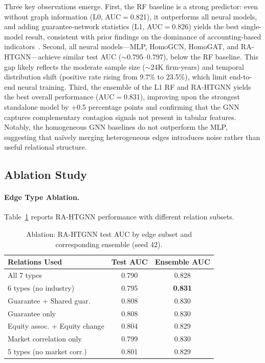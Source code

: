 \documentclass[3p,times,procedia]{elsarticle}
\begin{document}
Three key observations emerge.
First, the RF baseline is a strong predictor: even without graph information (L0, AUC$=$0.821), it outperforms all neural models, and adding guarantee-network statistics (L1, AUC$=$0.826) yields the best single-model result, consistent with prior findings on the dominance of accounting-based indicators~\cite{barboza2017machine, duan2012multiperiod}.
Second, all neural models---MLP, HomoGCN, HomoGAT, and RA-HTGNN---achieve similar test AUC ($\sim$0.795--0.797), below the RF baseline. This gap likely reflects the moderate sample size ($\sim$24K firm-years) and temporal distribution shift (positive rate rising from 9.7\% to 23.5\%), which limit end-to-end neural training.
Third, the ensemble of the L1 RF and RA-HTGNN yields the best overall performance (AUC$=$0.831), improving upon the strongest standalone model by $+$0.5 percentage points and confirming that the GNN captures complementary contagion signals not present in tabular features.
Notably, the homogeneous GNN baselines do not outperform the MLP, suggesting that na\"{i}vely merging heterogeneous edges introduces noise rather than useful relational structure.


\subsection{Ablation Study}
\label{subsec:ablation}

\paragraph{Edge Type Ablation.}
Table~\ref{tab:ablation} reports RA-HTGNN performance with different relation subsets.

\begin{table}[htbp]
\centering
\caption{Ablation: RA-HTGNN test AUC by edge subset and corresponding ensemble (seed 42).}\label{tab:ablation}
\begin{tabular}{@{}lcc@{}}
\toprule
Relations Used & Test AUC & Ensemble AUC \\
\midrule
All 7 types & 0.790 & 0.828 \\
6 types (no industry) & 0.795 & \textbf{0.831} \\
Guarantee + Shared guar. & 0.808 & 0.830 \\
Guarantee only & 0.808 & 0.830 \\
Equity assoc. + Equity change & 0.804 & 0.829 \\
Market correlation only & 0.799 & 0.830 \\
5 types (no market corr.) & 0.801 & 0.829 \\
\bottomrule
\end{tabular}
\end{table}
\end{document}
